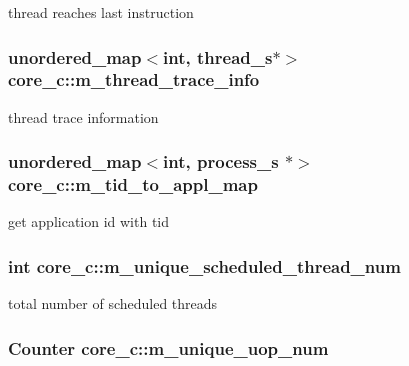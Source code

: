 \label{classcore__c_a91a431d714f4e1872d994db0308ca801}
thread reaches last instruction \hypertarget{classcore__c_a83a3dc71ffb0f30eee3c142e2a0799af}{
\subsubsection[{m\_\-thread\_\-trace\_\-info}]{\setlength{\rightskip}{0pt plus 5cm}unordered\_\-map$<$int, {\bf thread\_\-s}$\ast$$>$ {\bf core\_\-c::m\_\-thread\_\-trace\_\-info}}}
\label{classcore__c_a83a3dc71ffb0f30eee3c142e2a0799af}
thread trace information \hypertarget{classcore__c_ae779882c44efa9eab03a16bba514805f}{
\subsubsection[{m\_\-tid\_\-to\_\-appl\_\-map}]{\setlength{\rightskip}{0pt plus 5cm}unordered\_\-map$<$int, {\bf process\_\-s} $\ast$$>$ {\bf core\_\-c::m\_\-tid\_\-to\_\-appl\_\-map}}}
\label{classcore__c_ae779882c44efa9eab03a16bba514805f}
get application id with tid \hypertarget{classcore__c_aed9d122b2ca3860330f9c022864f902f}{
\subsubsection[{m\_\-unique\_\-scheduled\_\-thread\_\-num}]{\setlength{\rightskip}{0pt plus 5cm}int {\bf core\_\-c::m\_\-unique\_\-scheduled\_\-thread\_\-num}}}
\label{classcore__c_aed9d122b2ca3860330f9c022864f902f}
total number of scheduled threads \hypertarget{classcore__c_aebd17d803bc985fcc24c9c552286273c}{
\subsubsection[{m\_\-unique\_\-uop\_\-num}]{\setlength{\rightskip}{0pt plus 5cm}Counter {\bf core\_\-c::m\_\-unique\_\-uop\_\-num}}}
